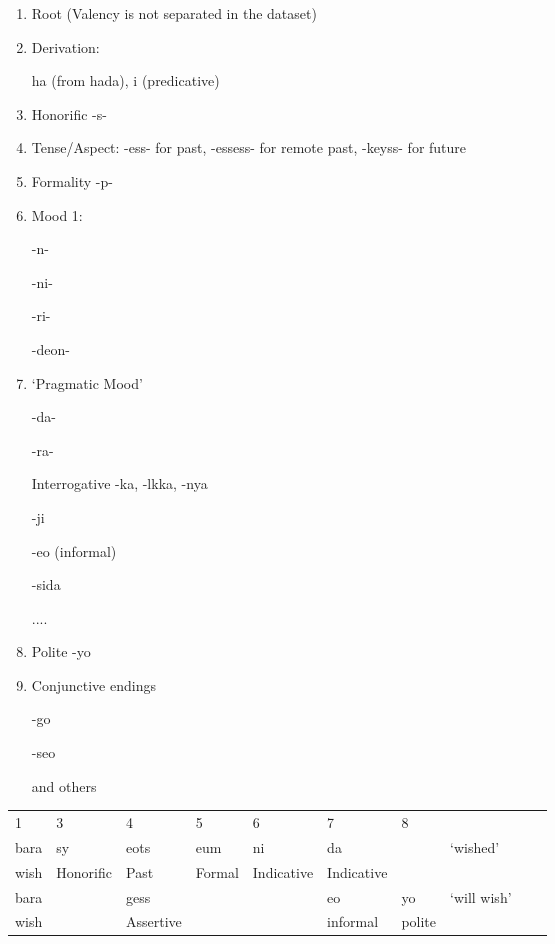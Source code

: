 \documentclass[11pt,letterpaper]{article}
\begin{document}
\begin{enumerate}
    \item Root (Valency is not separated in the dataset)
    \item Derivation:
    
    ha (from hada), i (predicative)
    
    \item Honorific -s-
    \item Tense/Aspect: -ess- for past, -essess- for remote past, -keyss- for future
    \item Formality -p-
    \item Mood 1:
    
    -n-
    
    -ni-
    
    -ri-
    
    -deon-
    
    \item `Pragmatic Mood'
    
    -da-
    
    -ra-
    
    Interrogative -ka, -lkka, -nya
    
    -ji
    
    -eo (informal)
    
    -sida
    
    ....
    
    \item Polite -yo
    \item Conjunctive endings
    
    -go
    
    -seo
    
    and others
    
\end{enumerate}


\begin{tabular}{llllllllll}
1    & 3 & 4     & 5   & 6  & 7 & 8 \\
bara & sy & eots & eum & ni & da  & &  `wished'\\
wish & Honorific & Past & Formal & Indicative & Indicative \\
bara& & gess &  & &  eo & yo  &  `will wish' \\
wish  & &  Assertive && & informal & polite \\
\end{tabular}
\end{document}
